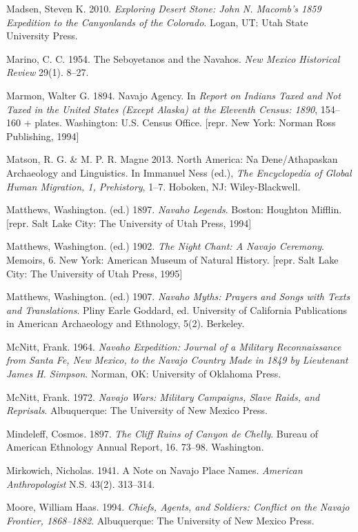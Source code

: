 \begin{hang}
	Madsen, Steven K.  2010. \textit{Exploring Desert Stone: John N. Macomb’s 1859 Expedition to the Canyonlands of the Colorado}.  Logan, UT:  Utah State University Press.

	Marino, C. C.  1954. The Seboyetanos and the Navahos.  \textit{New Mexico Historical Review} 29(1). 8--27.

	Marmon, Walter G.  1894.  Navajo Agency.  In \textit{Report on Indians Taxed and Not Taxed in the United States (Except Alaska) at the Eleventh Census: 1890},   154--160 + plates.  Washington:  U.S. Census Office.  [repr. New York:  Norman Ross Publishing, 1994]

	Matson, R. G. \& M. P. R. Magne  2013.  North America: Na Dene/Athapaskan Archaeology and Linguistics. In Immanuel Ness (ed.), \textit{The Encyclopedia of Global Human Migration, 1, Prehistory},  1--7.  Hoboken, NJ:  Wiley-Blackwell.

	Matthews, Washington. (ed.)  1897. \textit{Navaho Legends}.  Boston:  Houghton Mifflin.  [repr. Salt Lake City:  The University of Utah Press, 1994]


	Matthews, Washington. (ed.)  1902. \textit{The Night Chant: A Navajo Ceremony}.  Memoirs, 6.  New York:  American Museum of Natural History.  [repr. Salt Lake City:  The University of Utah Press, 1995]

	Matthews, Washington. (ed.)  1907. \textit{Navaho Myths: Prayers and Songs with Texts and Translations}.  Pliny Earle Goddard, ed.  University of California Publications in American Archaeology and Ethnology, 5(2).  Berkeley.

	McNitt, Frank. 1964. \textit{Navaho Expedition: Journal of a Military Reconnaissance from Santa Fe, New Mexico, to the Navajo Country Made in 1849 by Lieutenant James H. Simpson}.  Norman, OK:  University of Oklahoma Press.

	McNitt, Frank. 1972. \textit{Navajo Wars: Military Campaigns, Slave Raids, and Reprisals}.  Albuquerque:  The University of New Mexico Press.

	Mindeleff, Cosmos. 1897. \textit{The Cliff Ruins of Canyon de Chelly}.  Bureau of American Ethnology Annual Report, 16. 73--98.  Washington.

	Mirkowich, Nicholas. 1941.  A Note on Navajo Place Names.  \textit{American Anthropologist} N.S. 43(2). 313--314.

	Moore, William Haas. 1994. \textit{Chiefs, Agents, and Soldiers: Conflict on the Navajo Frontier, 1868--1882}.  Albuquerque:  The University of New Mexico Press.


\end{hang}
